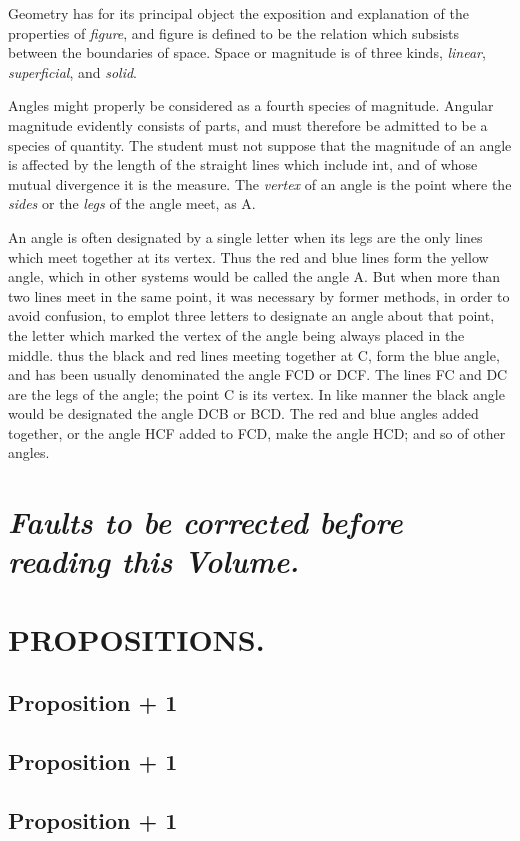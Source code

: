 		Geometry has for its principal object the exposition and explanation of the properties of \textit{figure}, and figure is defined to be the relation which subsists between the boundaries of space. Space or magnitude is of three kinds, \textit{linear}, \textit{superficial}, and \textit{solid}. 

		Angles might properly be considered as a fourth species of magnitude. Angular magnitude evidently consists of parts, and must therefore be admitted to be a species of quantity. The student must not suppose that the magnitude of an angle is affected by the length of the straight lines which include int, and of whose mutual divergence it is the measure. The \textit{vertex} of an angle is the point where the \textit{sides} or the \textit{legs} of the angle meet, as A. 

		An angle is often designated by a single letter when its legs are the only lines which meet together at its vertex. Thus the red and blue lines form the yellow angle, which in other systems would be called the angle A. But when more than two lines meet in the same point, it was necessary by former methods, in order to avoid confusion, to emplot three letters to designate an angle about that point, the letter which marked the vertex of the angle being always placed in the middle. thus the black and red lines meeting together at C, form the blue angle, and has been usually denominated the angle FCD or DCF. The lines FC and DC are the legs of the angle; the point C is its vertex. In like manner the black angle would be designated the angle DCB or BCD. The red and blue angles added together, or the angle HCF added to FCD, make the angle HCD; and so of other angles. 


		\newpage
		{\centering\section[CORRIGENDA.]{\textit{Faults to be corrected before reading this Volume.}}
		\label{section\thesection}}
		\clearpage
		{\centering\section{PROPOSITIONS.}
		\label{section\thesection}}


		\subsection{Proposition \the\numexpr \theprop + 1}
		
		\clearpage
		\subsection{Proposition \the\numexpr \theprop + 1}
		
		\clearpage
		\subsection{Proposition \the\numexpr \theprop + 1}
		
		\clearpage
